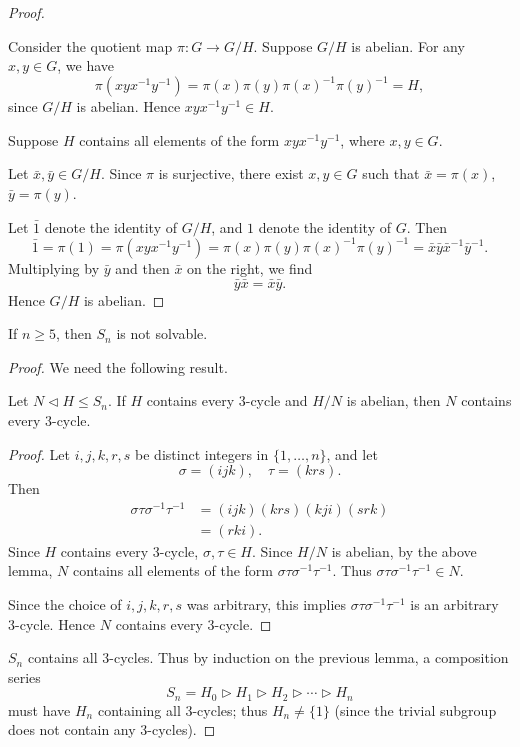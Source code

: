 \begin{proof} \

\forward Consider the quotient map $\pi\colon G\to G/H$.
Suppose $G/H$ is abelian.
For any $x,y\in G$, we have
\[\pi(xyx^{-1}y^{-1})=\pi(x)\pi(y)\pi(x)^{-1}\pi(y)^{-1}=H,\]
since $G/H$ is abelian. Hence $xyx^{-1}y^{-1}\in H$.

\backward Suppose $H$ contains all elements of the form $xyx^{-1}y^{-1}$, where $x,y\in G$.

Let $\bar{x},\bar{y}\in G/H$. Since $\pi$ is surjective, there exist $x,y\in G$ such that $\bar{x}=\pi(x)$, $\bar{y}=\pi(y)$. 

Let $\bar{1}$ denote the identity of $G/H$, and $1$ denote the identity of $G$. 
Then
\[\bar{1}=\pi(1)=\pi(xyx^{-1}y^{-1})=\pi(x)\pi(y)\pi(x)^{-1}\pi(y)^{-1}=\bar{x}\bar{y}\bar{x}^{-1}\bar{y}^{-1}.\]
Multiplying by $\bar{y}$ and then $\bar{x}$ on the right, we find
\[\bar{y}\bar{x}=\bar{x}\bar{y}.\]
Hence $G/H$ is abelian.
\end{proof}

\begin{theorem}
If $n\ge 5$, then $S_n$ is not solvable.
\end{theorem}

\begin{proof}
We need the following result.
\begin{lemma*}
Let $N\triangleleft H\le S_n$. If $H$ contains every 3-cycle and $H/N$ is abelian, then $N$ contains every 3-cycle.
\end{lemma*}

\begin{proof}
Let $i,j,k,r,s$ be distinct integers in $\{1,\dots,n\}$, and let
\[\sigma=(ijk),\quad\tau=(krs).\]
Then
\begin{align*}
\sigma\tau\sigma^{-1}\tau^{-1}
&=(ijk)(krs)(kji)(srk)\\
&=(rki).
\end{align*}
Since $H$ contains every 3-cycle, $\sigma,\tau\in H$. Since $H/N$ is abelian, by the above lemma, $N$ contains all elements of the form $\sigma\tau\sigma^{-1}\tau^{-1}$. Thus $\sigma\tau\sigma^{-1}\tau^{-1}\in N$. 

Since the choice of $i,j,k,r,s$ was arbitrary, this implies $\sigma\tau\sigma^{-1}\tau^{-1}$ is an arbitrary 3-cycle. Hence $N$ contains every 3-cycle.
\end{proof}

$S_n$ contains all 3-cycles. Thus by induction on the previous lemma, a composition series
\[S_n=H_0\triangleright H_1\triangleright H_2\triangleright\cdots\triangleright H_n\]
must have $H_n$ containing all 3-cycles; thus $H_n\neq\{1\}$ (since the trivial subgroup does not contain any 3-cycles).
\end{proof}
\pagebreak

